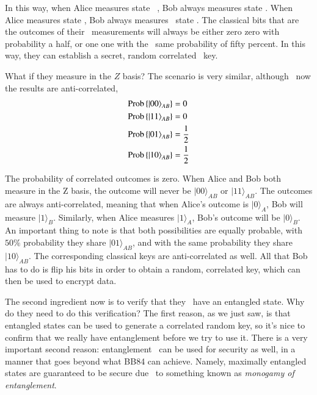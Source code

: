 In this way, when Alice measures state 
\ket{+}, Bob always measures state \ket{+}. When
Alice measures state \ket{-}, Bob always measures 
state \ket{-}. The classical bits
that are the outcomes of their 
measurements will always be either zero
zero with probability a half, or one one with the 
same probability of fifty percent. In this way,
they can establish a secret, random correlated 
key.

What if they measure in the $Z$ basis? The scenario is very similar, although 
now the results are anti-correlated,
\begin{align}
\begin{aligned}
\operatorname{Prob}\left\{\left| 00 \right\rangle_{A B}\right\} &= 0 \\ 
\operatorname{Prob}\left\{\left| 11 \right\rangle_{A B}\right\} &= 0 \\
\operatorname{Prob}\left\{\left| 01 \right\rangle_{A B}\right\} &= \frac{1}{2} \\ 
\operatorname{Prob}\left\{\left| 10 \right\rangle_{A B}\right\} &= \frac{1}{2}
\end{aligned}
\end{align}

The probability of correlated outcomes is zero.
When Alice and Bob both measure in the Z basis, the outcome will never be $|00\rangle_{AB}$ or $|11\rangle_{AB}$.
The outcomes are always anti-correlated, meaning that when Alice's outcome is $|0\rangle_A$, Bob will measure $|1\rangle_B$.
Similarly, when Alice measures $|1\rangle_A$, Bob's outcome will be $|0\rangle_B$.
An important thing to note is that both possibilities are equally probable, with $50\%$ probability they share $|01\rangle_{AB}$, and with the same probability they share $|10\rangle_{AB}$.
The corresponding classical keys are anti-correlated as well.
All that Bob has to do is flip his bits in order to obtain a random, correlated key, which can then be used to encrypt data.

The second ingredient now is to verify that they 
have an entangled state. Why do they need to do
this verification? The first reason, as we just saw, is
that entangled states can be used to generate a
correlated random key, so it's nice to confirm that we really have entanglement before we try to use it. There is a very 
important second reason: entanglement 
can be used for security as well, in a manner that goes beyond what BB84 can achieve. Namely, maximally
entangled states are guaranteed to be secure due 
to something known as \emph{monogamy of entanglement}.

